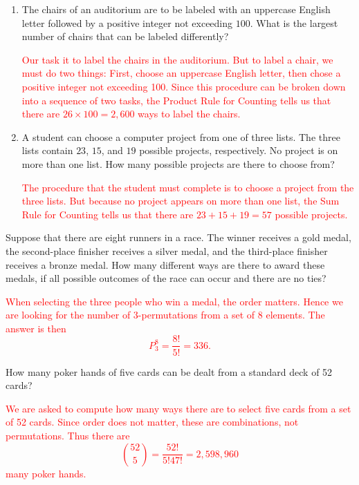 \documentclass[12pt,reqno]{amsart}
\begin{document}
\bigskip
\prob

\begin{enumerate}
\item The chairs of an auditorium are to be labeled with an uppercase English letter followed by a positive integer not exceeding $100$. What is the largest number of chairs that can be labeled differently?

\bigskip
\textcolor{red}{Our task it to label the chairs in the auditorium. But to label a chair, we must do two things: First, choose an uppercase English letter, then chose a positive integer not exceeding 100. Since this procedure can be broken down into a sequence of two tasks, the Product Rule for Counting tells us that there are $26 \times 100 = 2{,}600$ ways to label the chairs.}
\bigskip

\item A student can choose a computer project from one of three lists. The three lists contain $23$, $15$, and $19$ possible projects, respectively. No project is on more than one list. How many possible projects are there to choose from?

\bigskip
\textcolor{red}{The procedure that the student must complete is to choose a project from the three lists. But because no project appears on more than one list, the Sum Rule for Counting tells us that there are $23+15+19 = 57$ possible projects.}
\end{enumerate}









\bigskip
\prob Suppose that there are eight runners in a race. The winner receives a gold medal, the second-place finisher receives a silver medal, and the third-place finisher receives a bronze medal. How many different ways are there to award these medals, if all possible outcomes of the race can occur and there are no ties?

\bigskip
\textcolor{red}{When selecting the three people who win a medal, the order matters. Hence we are looking for the number of $3$-permutations from a set of $8$ elements. The answer is then
	\[
	P^8_3 = \frac{8!}{5!} = 336.
	\]}
\bigskip







\prob How many poker hands of five cards can be dealt from a standard deck of 52 cards?

\bigskip
\textcolor{red}{We are asked to compute how many ways there are to select five cards from a set of 52 cards. Since order does not matter, these are combinations, not permutations. Thus there are
	\[
	\binom{52}{5} = \frac{52!}{5!47!} = 2,598,960
	\]
many poker hands.}
\bigskip
\end{document}
